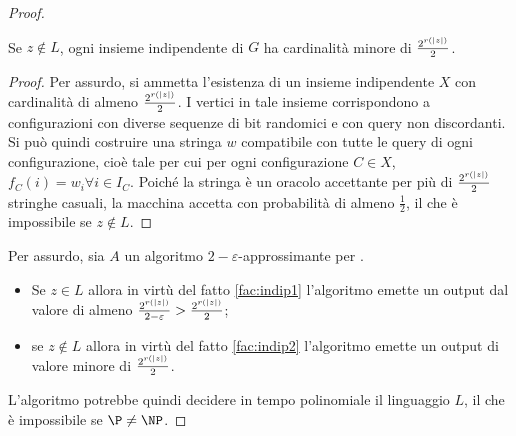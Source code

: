 \begin{proof}
	\begin{fact}\label{fac:indip2}
		Se $z\notin L$, ogni insieme indipendente di $G$ ha cardinalità minore di $\frac{2^{r(|z|)}}{2}$.
	\end{fact}
	\begin{proof}
		Per assurdo, si ammetta l'esistenza di un insieme indipendente $X$ con cardinalità di almeno $\frac{2^{r(|z|)}}{2}$.
		I vertici in tale insieme corrispondono a configurazioni con diverse sequenze di bit randomici e con query non discordanti.
		Si può quindi costruire una stringa $w$ compatibile con tutte le query di ogni configurazione, cioè tale per cui per ogni configurazione $C\in X$, $f_C(i)=w_i\forall i\in I_C$.
		Poiché la stringa è un oracolo accettante per più di $\frac{2^{r(|z|)}}{2}$ stringhe casuali, la macchina accetta con probabilità di almeno $\frac12$, il che è impossibile se $z\notin L$.
	\end{proof}

	Per assurdo, sia $A$ un algoritmo $2-\varepsilon$-approssimante per \IndependentSet.
	\begin{itemize}
		\item Se $z\in L$ allora in virtù del fatto \ref{fac:indip1} l'algoritmo emette un output dal valore di almeno $\frac{2^{r(|z|)}}{2-\varepsilon}>\frac{2^{r(|z|)}}{2}$;
		\item se $z\notin L$ allora in virtù del fatto \ref{fac:indip2} l'algoritmo emette un output di valore minore di $\frac{2^{r(|z|)}}{2}$.
	\end{itemize}
	L'algoritmo potrebbe quindi decidere in tempo polinomiale il linguaggio $L$, il che è impossibile se $\P\neq\NP$.
\end{proof}
